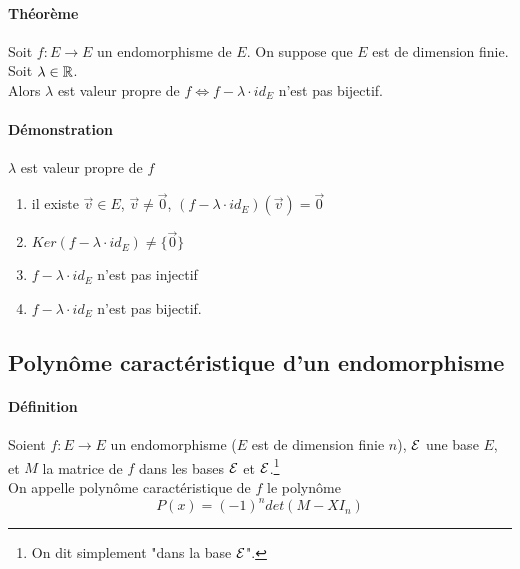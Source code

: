 \begin{enumerate}
\end{enumerate}

\paragraph{Théorème} Soit $f: E \rightarrow E$ un endomorphisme de $E$. On suppose que $E$ est de dimension finie. Soit $\lambda \in \mathbb{R}$. \\
Alors $\lambda$ est valeur propre de $f \Leftrightarrow f- \lambda \cdot id_E$ n'est pas bijectif.
      
\paragraph{Démonstration} $\lambda$ est valeur propre de $f$
\begin{enumerate}[$\Leftrightarrow$]
  \item il existe $\vec{v} \in E$, $\vec{v} \neq \vec{0}$, $(f - \lambda \cdot id_E)(\vec{v}) = \vec{0}$ 
  \item $Ker(f-\lambda\cdot id_E) \neq \{\vec{0}\}$
  \item $f-\lambda \cdot id_E$ n'est pas injectif 
  \item $f-\lambda \cdot id_E$ n'est pas bijectif.
\end{enumerate}

%
\subsection{Polynôme caractéristique d'un endomorphisme}
%
\paragraph{Définition} Soient $f: E \rightarrow E$ un endomorphisme ($E$ est de dimension finie $n$), $\mathcal{E}$ une base $E$, et $M$ la matrice de $f$ dans les bases $\mathcal{E}$ et $\mathcal{E}$.\footnote{On dit simplement "dans la base $\mathcal{E}$".} \\
On appelle polynôme caractéristique de $f$ le polynôme
$$P(x) = (-1)^{n} det(M - X I_n)$$

